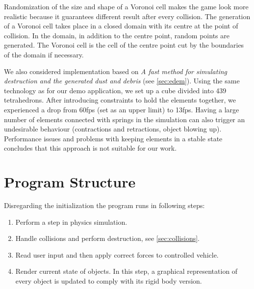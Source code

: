 Randomization of the size and shape of a Voronoi cell makes the game look more realistic because it guarantees different result after every collision. The generation of a Voronoi cell takes place in a closed domain with its centre at the point of collision. In the domain, in addition to the centre point, random points are generated. The Voronoi cell is the cell of the centre point cut by the boundaries of the domain if necessary.

We also considered implementation based on \emph{A fast method for simulating destruction and the generated dust and debris} (see \cref{sec:edem}). Using the same technology as for our demo application, we set up a cube divided into 439 tetrahedrons. After introducing constraints to hold the elements together, we experienced a drop from 60fps (set as an upper limit) to 13fps. Having a large number of elements connected with springs in the simulation can also trigger an undesirable behaviour (contractions and retractions, object blowing up). Performance issues and problems with keeping elements in a stable state concludes that this approach is not suitable for our work.




\section{Program Structure}
Disregarding the initialization the program runs in following steps:
\begin{enumerate}
\item Perform a step in physics simulation.
\item Handle collisions and perform destruction, see \cref{sec:collisions}.
\item Read user input and then apply correct forces to controlled vehicle.
\item Render current state of objects. In this step, a graphical representation of every object is updated to comply with its rigid body version.
\end{enumerate}

